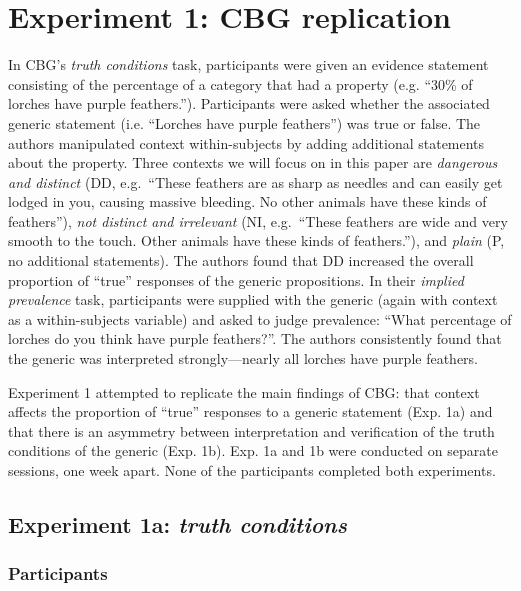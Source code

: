 \documentclass[10pt,letterpaper]{article}
\begin{document}
\section{Experiment 1: CBG replication}

In CBG's \emph{truth conditions} task, participants were given an evidence statement consisting of the percentage of a category that had a property (e.g. ``30\% of lorches have purple feathers.''). Participants were asked whether the associated generic statement (i.e. ``Lorches have purple feathers'') was true or false. The authors manipulated context within-subjects by adding additional statements about the property. Three contexts we will focus on in this paper are \emph{dangerous and distinct} (DD, e.g.~``These feathers are as sharp as needles and can easily get lodged in you, causing massive bleeding. No other animals have these kinds of feathers''), \emph{not distinct and irrelevant} (NI, e.g.~``These feathers are wide and very smooth to the touch. Other animals have these kinds of feathers.''), and \emph{plain} (P, no additional statements). The authors found that DD increased the overall proportion of ``true'' responses of the generic propositions. 
In their \emph{implied prevalence} task, participants were supplied with the generic (again with context as a within-subjects variable) and asked to judge prevalence: ``What percentage of lorches do you think have purple feathers?''. The authors consistently found that the generic was interpreted strongly---nearly all lorches have purple feathers. 

Experiment 1 attempted to replicate the main findings of CBG: that context affects the proportion of ``true'' responses to a generic statement (Exp. 1a) and that there is an asymmetry between interpretation and verification of the truth conditions of the generic (Exp. 1b). 
Exp. 1a and 1b were conducted on separate sessions, one week apart. None of the participants completed both experiments.

\subsection{Experiment 1a: \emph{truth conditions}}

\subsubsection{Participants}
\end{document}
